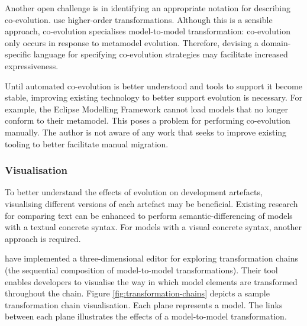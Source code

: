 Another open challenge is in identifying an appropriate notation for describing co-evolution.  \cite{wachsmuth07metamodel,cicchetti08automating} use higher-order transformations. Although this is a sensible approach, co-evolution specialises model-to-model transformation: co-evolution only occurs in response to metamodel evolution. Therefore, devising a domain-specific language for specifying co-evolution strategies may facilitate increased expressiveness.

Until automated co-evolution is better understood and tools to support it become stable, improving existing technology to better support evolution is necessary. For example, the Eclipse Modelling Framework \cite{emf} cannot load models that no longer conform to their metamodel. This poses a problem for performing co-evolution manually. The author is not aware of any work that seeks to improve existing tooling to better facilitate manual migration.


\subsubsection{Visualisation}
To better understand the effects of evolution on development artefacts, visualising different versions of each artefact may be beneficial. Existing research for comparing text can be enhanced to perform semantic-differencing of models with a textual concrete syntax. For models with a visual concrete syntax, another approach is required. 

\cite{pilgrim08constructing} have implemented a three-dimensional editor for exploring transformation chains (the sequential composition of model-to-model transformations). Their tool enables developers to visualise the way in which model elements are transformed throughout the chain. Figure \ref{fig:transformation-chains} depicts a sample transformation chain visualisation. Each plane represents a model. The links between each plane illustrates the effects of a model-to-model transformation.

